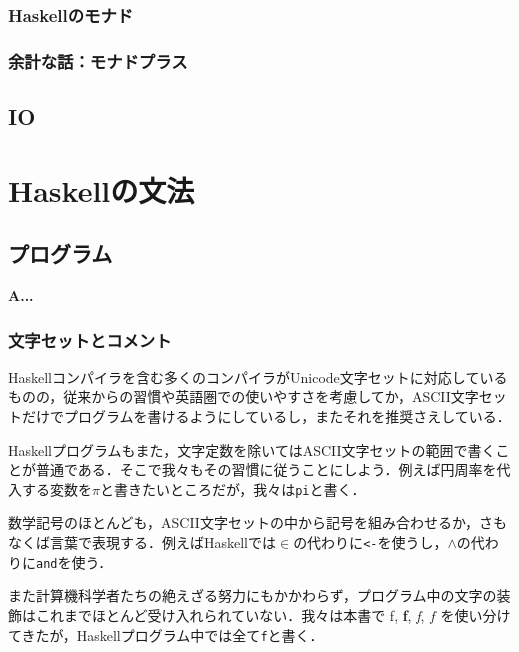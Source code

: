 \documentclass[twocolumn]{jsbook}
\newcommand{\programminglanguage}[1]{\textsf{#1}}
\newcommand{\haskell}{\programminglanguage{Haskell}}
\newcommand{\code}[1]{\texttt{#1}}
\newenvironment{leader}{\begingroup\bf}{\endgroup}
\begin{document}
\section{\haskell のモナド}


\section{余計な話：モナドプラス}

\chapter{IO}



\part{\haskell の文法}

\chapter{プログラム}

\begin{leader}
A...
\end{leader}


\section{文字セットとコメント}

\haskell コンパイラを含む多くのコンパイラがUnicode文字セットに対応しているものの，従来からの習慣や英語圏での使いやすさを考慮してか，ASCII文字セットだけでプログラムを書けるようにしているし，またそれを推奨さえしている．

\haskell プログラムもまた，文字定数を除いてはASCII文字セットの範囲で書くことが普通である．そこで我々もその習慣に従うことにしよう．例えば円周率を代入する変数を$\pi$と書きたいところだが，我々は\code{pi}と書く．

数学記号のほとんども，ASCII文字セットの中から記号を組み合わせるか，さもなくば言葉で表現する．例えば\haskell では$\in$の代わりに\code{<-}を使うし，$\wedge$の代わりに\code{and}を使う．

また計算機科学者たちの絶えざる努力にもかかわらず，プログラム中の文字の装飾はこれまでほとんど受け入れられていない．我々は本書で \textrm{f}, \textbf{f}, \textit{f}, $f$ を使い分けてきたが，\haskell プログラム中では全て\code{f}と書く．
\end{document}
